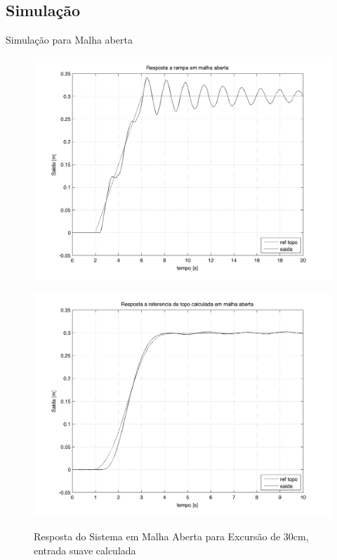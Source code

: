 \documentclass[10pt]{beamer}
\begin{document}
\subsection{Simulação}
\begin{frame}[fragile]{Simulação para Malha aberta}
	 \begin{figure}[!htb]
    \centering
    \begin{minipage}{.49\textwidth}
        \centering
        
        \includegraphics[width=1\linewidth]{figures/resultados/simulacao/respostaMalhaAbertaRampa}
        \label{respostaMalhaAbertaRampa}
        \caption{Resposta do Sistema em Malha Aberta para Excursão de 30cm, entrada rampa}
    \end{minipage}%
    \hspace{0.1cm}
    \begin{minipage}{0.49\textwidth}
        \centering
        
        \includegraphics[width=1\linewidth]{figures/resultados/simulacao/respostaMalhaAbertaRefTopo}
        \label{respostaMalhaAbertaEntradaSuave}
        \caption{Resposta do Sistema em Malha Aberta para Excursão de 30cm, entrada suave calculada}
    \end{minipage}
\end{figure}
\end{frame}
\end{document}
